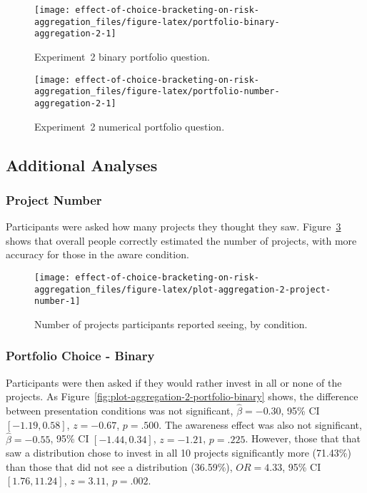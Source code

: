 \documentclass[
  english,
  man, donotrepeattitle,floatsintext]{apa7}
\theoremstyle{definition}
\theoremstyle{definition}
\theoremstyle{definition}
\theoremstyle{definition}
\theoremstyle{remark}
\begin{document}
\begin{figure}
\texttt{[image: effect-of-choice-bracketing-on-risk-aggregation\_files/figure-latex/portfolio-binary-aggregation-2-1]} \caption{Experiment~2 binary portfolio question.}\label{fig:portfolio-binary-aggregation-2}
\end{figure}



\begin{figure}
\texttt{[image: effect-of-choice-bracketing-on-risk-aggregation\_files/figure-latex/portfolio-number-aggregation-2-1]} \caption{Experiment~2 numerical portfolio question.}\label{fig:portfolio-number-aggregation-2}
\end{figure}

\hypertarget{results-aggregation-2-appendix}{%
\subsection{Additional Analyses}\label{results-aggregation-2-appendix}}

\hypertarget{project-number}{%
\subsubsection{Project Number}\label{project-number}}

Participants were asked how many projects they thought they saw.
Figure~\ref{fig:plot-aggregation-2-project-number} shows that overall people
correctly estimated the number of projects, with more accuracy for those in the
aware condition.



\begin{figure}
\texttt{[image: effect-of-choice-bracketing-on-risk-aggregation\_files/figure-latex/plot-aggregation-2-project-number-1]} \caption{Number of projects participants reported seeing, by condition.}\label{fig:plot-aggregation-2-project-number}
\end{figure}

\hypertarget{portfolio-choice---binary}{%
\subsubsection{Portfolio Choice - Binary}\label{portfolio-choice---binary}}

Participants were then asked if they would rather invest in all or none of the
projects. As Figure~\ref{fig:plot-aggregation-2-portfolio-binary} shows, the
difference between presentation conditions was not significant,
\(\hat{\beta} = -0.30\), 95\% CI \([-1.19, 0.58]\), \(z = -0.67\), \(p = .500\). The
awareness effect was also not significant,
\(\hat{\beta} = -0.55\), 95\% CI \([-1.44, 0.34]\), \(z = -1.21\), \(p = .225\). However,
those that that saw a distribution chose to invest in all 10 projects
significantly more
(71.43\%) than
those that did not see a distribution
(36.59\%),
\(OR = 4.33\), 95\% CI \([1.76, 11.24]\), \(z = 3.11\), \(p = .002\).
\end{document}

